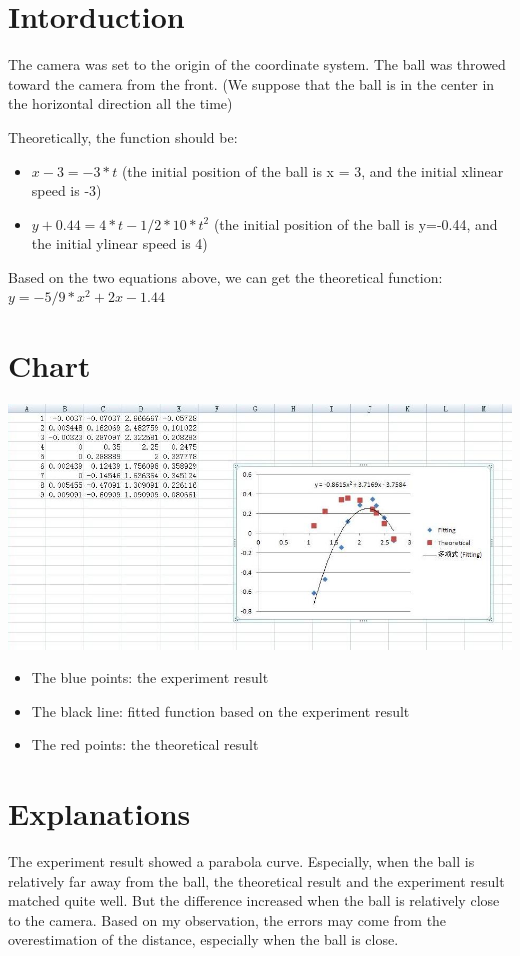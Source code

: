 \documentclass[12pt]{article}
\begin{document}
\maketitle

\section{Intorduction}
The camera was set to the origin of the coordinate system. The ball was throwed toward the camera from the front. (We suppose that the ball is in the center in the horizontal direction all the time)

Theoretically, the function should be:
\begin{itemize}
\item $x - 3 = -3 * t$ (the initial position of the ball is x = 3, and the initial xlinear speed is -3)
\item $y + 0.44 = 4 * t - 1/2 * 10 * t^{2}$ (the initial position of the ball is y=-0.44, and the initial ylinear speed is 4)
\end{itemize}
Based on the two equations above, we can get the theoretical function:
$y = -5/9 * x^{2} + 2x - 1.44$
\section{Chart}
\includegraphics[scale = 0.5]{../../fit_function.jpg}
\begin{itemize}
\item The blue points: the experiment result
\item The black line: fitted function based on the experiment result
\item The red points: the theoretical result
\end{itemize}
\section{Explanations}
The experiment result showed a parabola curve. Especially, when the ball is relatively far away from the ball, the theoretical result and the experiment result matched quite well. But the difference increased when the ball is relatively close to the camera. Based on my observation, the errors may come from the overestimation of the distance, especially when the ball is close.
\end{document}
